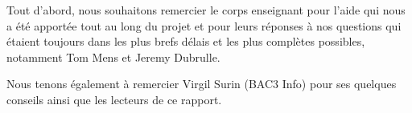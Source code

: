 \documentclass[../rapport.tex]{subfiles}
\begin{document}
Tout d'abord, nous souhaitons remercier le corps enseignant pour l'aide qui nous a été apportée
tout au long du projet et pour leurs réponses à nos questions qui étaient toujours dans les 
plus brefs délais et les plus complètes possibles, notamment Tom Mens et Jeremy Dubrulle.

\bigskip

Nous tenons également à remercier Virgil Surin (BAC3 Info) pour ses quelques conseils ainsi que
les lecteurs de ce rapport.

\newpage
\end{document}
